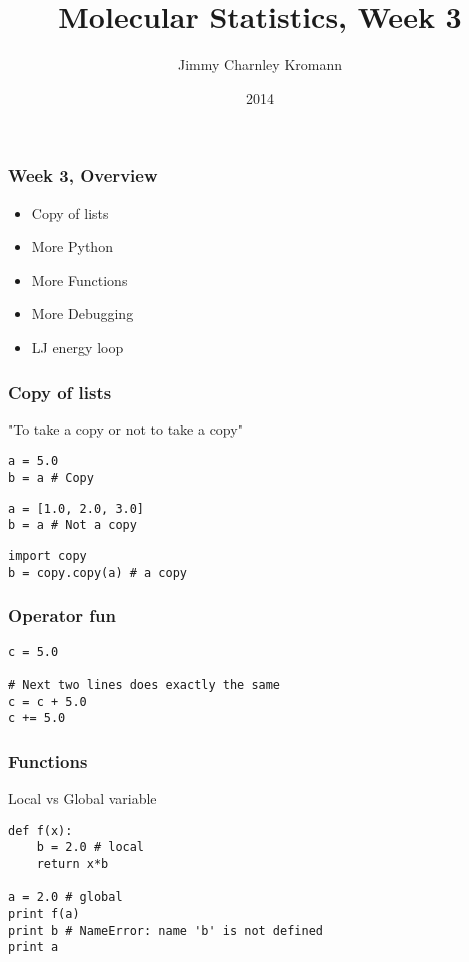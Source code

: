 \documentclass{beamer}
\title[]{Molecular Statistics, Week 3}
\institute[University of Copenhagen]{Department of Chemistry \\ University of Copenhagen}
\author[Jimmy Charnley Kromann]{Jimmy Charnley Kromann}
\date{2014}
\begin{document}
\frame[plain]{\titlepage}


\begin{frame}[fragile]

    \frametitle{Week 3, Overview}

    \begin{itemize}
        \item Copy of lists
        \item More Python
        \item More Functions
        \item More Debugging
        \item LJ energy loop
    \end{itemize}

\end{frame}


\begin{frame}[fragile]

    \frametitle{Copy of lists}

    "To take a copy or not to take a copy"

    \bigskip

\begin{lstlisting}
a = 5.0
b = a # Copy
\end{lstlisting}

\begin{lstlisting}
a = [1.0, 2.0, 3.0]
b = a # Not a copy
\end{lstlisting}

\begin{lstlisting}
import copy
b = copy.copy(a) # a copy
\end{lstlisting}

\end{frame}


\begin{frame}[fragile]

    \frametitle{Operator fun}

\begin{lstlisting}
c = 5.0

# Next two lines does exactly the same
c = c + 5.0
c += 5.0
\end{lstlisting}

\end{frame}


\begin{frame}[fragile]

    \frametitle{Functions}

    Local vs Global variable

    \bigskip

\begin{lstlisting}
def f(x):
    b = 2.0 # local
    return x*b

a = 2.0 # global
print f(a)
print b # NameError: name 'b' is not defined
print a
\end{lstlisting}

\end{frame}
\end{document}
